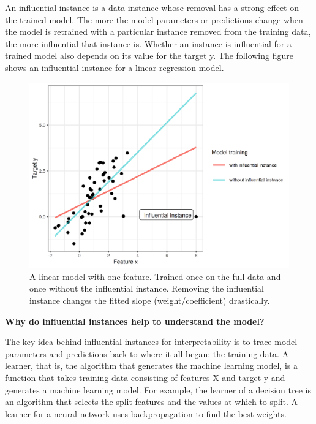 \documentclass[12pt,]{krantz}
\begin{document}
An influential instance is a data instance whose removal has a strong
effect on the trained model. The more the model parameters or
predictions change when the model is retrained with a particular
instance removed from the training data, the more influential that
instance is. Whether an instance is influential for a trained model also
depends on its value for the target y. The following figure shows an
influential instance for a linear regression model.

\begin{figure}

{\centering \includegraphics[width=\textwidth]{images/influential-point-1} 

}

\caption{A linear model with one feature. Trained once on the full data and once without the influential instance. Removing the influential instance changes the fitted slope (weight/coefficient) drastically.}\label{fig:influential-point}
\end{figure}

\textbf{Why do influential instances help to understand the model?}

The key idea behind influential instances for interpretability is to
trace model parameters and predictions back to where it all began: the
training data. A learner, that is, the algorithm that generates the
machine learning model, is a function that takes training data
consisting of features X and target y and generates a machine learning
model. For example, the learner of a decision tree is an algorithm that
selects the split features and the values at which to split. A learner
for a neural network uses backpropagation to find the best weights.
\end{document}
